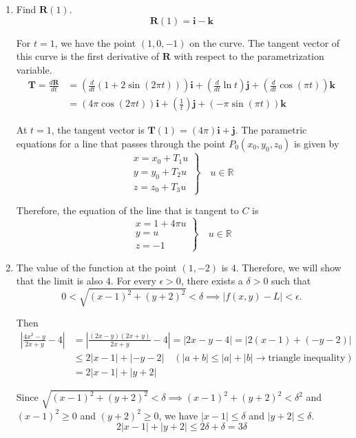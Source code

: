 \documentclass[a4paper, 12pt]{article}
\begin{document}
\begin{enumerate}[leftmargin=*,label=\textbf{\arabic*.}]
\newpage

\item Find $\mathbf{R}(1)$.
\[\mathbf{R}(1)=\mathbf{i}-\mathbf{k}\]

For $t=1$, we have the point $(1,0,-1)$ on the curve. The tangent vector of this curve is the first derivative of $\mathbf{R}$ with respect to the parametrization variable.
\begin{align*}\mathbf{T}=\frac{d\mathbf R}{dt}&=\left(\frac d{dt}\left(1+2\sin(2\pi t)\right)\right)\mathbf{i}+\left(\frac d{dt}\ln t\right)\mathbf{j}+\left(\frac d{dt}\cos(\pi t)\right)\mathbf{k}\\[1em]&=(4\pi\cos(2\pi t))\mathbf{i}+\left(\frac1t\right)\mathbf{j}+(-\pi\sin(\pi t))\mathbf{k}\end{align*}

At $t=1$, the tangent vector is $\mathbf{T}(1)=\left(4\pi\right)\mathbf{i}+\mathbf{j}$. The parametric equations for a line that passes through the point $P_0(x_0,y_0,z_0)$ is given by
\[\left.\begin{array}{c}
x=x_0+T_1u\\
y=y_0+T_2u\\
z=z_0+T_3u
\end{array}\right\}\quad u\in\mathbb{R}\]

Therefore, the equation of the line that is tangent to $C$ is
\[\boxed{\left.\begin{array}{l}
x=1+4\pi u\\
y=u\\
z=-1
\end{array}\right\}\quad u\in\mathbb{R}}\]

\item The value of the function at the point $(1,-2)$ is $4$. Therefore, we will show that the limit is also $4$. For every $\epsilon>0$, there exists a $\delta>0$ such that
\[0<\sqrt{(x-1)^2+(y+2)^2}<\delta\implies\left|f(x,y)-L\right|<\epsilon.\]

Then
\begin{align*}\left|\frac{4x^2-y}{2x+y}-4\right|&=\left|\frac{(2x-y)(2x+y)}{2x+y}-4\right|=\left|2x-y-4\right|=\left|2(x-1)+(-y-2)\right|\\[1em]&\leq2|x-1|+\left|-y-2\right|\quad \left(|a+b|\leq|a|+|b|\rightarrow\text{triangle inequality}\right)\\[1em]&=2|x-1|+|y+2|\end{align*}

Since $\sqrt{(x-1)^2+(y+2)^2}<\delta\implies(x-1)^2+(y+2)^2<\delta^2$ and $(x-1)^2\geq0$ and $(y+2)^2\geq0$, we have $|x-1|\leq\delta$ and $|y+2|\leq\delta$.
\[2|x-1|+|y+2|\leq2\delta+\delta=3\delta\]


\end{enumerate}
\end{document}
